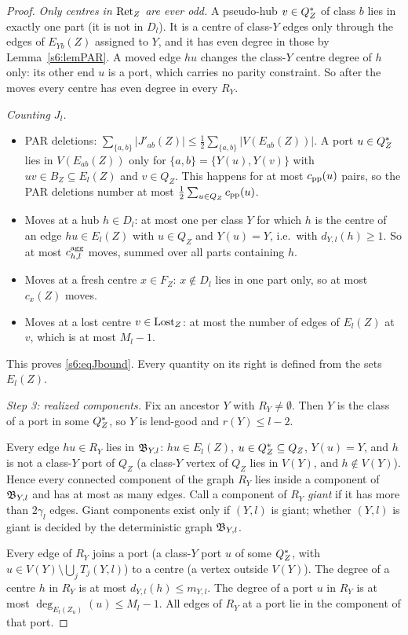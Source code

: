 \begin{proof}
\emph{Only centres in $\mathrm{Ret}_Z$ are ever odd.} A pseudo-hub $v\in Q^{*}_Z$ of class $b$ lies in exactly one part (it is not in $D_l$). It is a centre of class-$Y$ edges only through the edges of $E_{Yb}(Z)$ assigned to $Y$, and it has even degree in those by Lemma~\ref{s6:lemPAR}. A moved edge $hu$ changes the class-$Y$ centre degree of $h$ only: its other end $u$ is a port, which carries no parity constraint. So after the moves every centre has even degree in every $R_Y$.

\emph{Counting $J_l$.}
\begin{itemize}
\item PAR deletions: $\sum_{\{a,b\}}|J'_{ab}(Z)|\le\frac12\sum_{\{a,b\}}|V(E_{ab}(Z))|$. A port $u\in Q^{*}_Z$ lies in $V(E_{ab}(Z))$ only for $\{a,b\}=\{Y(u),Y(v)\}$ with $uv\in B_Z\subseteq E_l(Z)$ and $v\in Q_Z$. This happens for at most $c_{\mathrm{pp}}(u)$ pairs, so the PAR deletions number at most $\frac12\sum_{u\in Q_Z}c_{\mathrm{pp}}(u)$.
\item Moves at a hub $h\in D_l$: at most one per class $Y$ for which $h$ is the centre of an edge $hu\in E_l(Z)$ with $u\in Q_Z$ and $Y(u)=Y$, i.e.\ with $d_{Y,l}(h)\ge1$. So at most $c^{\mathrm{agg}}_{h,l}$ moves, summed over all parts containing $h$.
\item Moves at a fresh centre $x\in F_Z$: $x\notin D_l$ lies in one part only, so at most $c_x(Z)$ moves.
\item Moves at a lost centre $v\in\mathrm{Lost}_Z$: at most the number of edges of $E_l(Z)$ at $v$, which is at most $M_l-1$.
\end{itemize}
This proves \eqref{s6:eqJbound}. Every quantity on its right is defined from the sets $E_l(Z)$.

\emph{Step 3: realized components.} Fix an ancestor $Y$ with $R_Y\neq\emptyset$. Then $Y$ is the class of a port in some $Q^{*}_Z$, so $Y$ is lend-good and $r(Y)\le l-2$.

Every edge $hu\in R_Y$ lies in $\mathfrak{B}_{Y,l}$: $hu\in E_l(Z)$, $u\in Q^{*}_Z\subseteq Q_Z$, $Y(u)=Y$, and $h$ is not a class-$Y$ port of $Q_Z$ (a class-$Y$ vertex of $Q_Z$ lies in $V(Y)$, and $h\notin V(Y)$). Hence every connected component of the graph $R_Y$ lies inside a component of $\mathfrak{B}_{Y,l}$ and has at most as many edges. Call a component of $R_Y$ \emph{giant} if it has more than $2\gamma_l$ edges. Giant components exist only if $(Y,l)$ is giant; whether $(Y,l)$ is giant is decided by the deterministic graph $\mathfrak{B}_{Y,l}$.

Every edge of $R_Y$ joins a port (a class-$Y$ port $u$ of some $Q^{*}_Z$, with $u\in V(Y)\setminus\bigcup_jT_j(Y,l)$) to a centre (a vertex outside $V(Y)$). The degree of a centre $h$ in $R_Y$ is at most $d_{Y,l}(h)\le m_{Y,l}$. The degree of a port $u$ in $R_Y$ is at most $\deg_{E_l(Z_u)}(u)\le M_l-1$. All edges of $R_Y$ at a port lie in the component of that port.


\end{proof}
